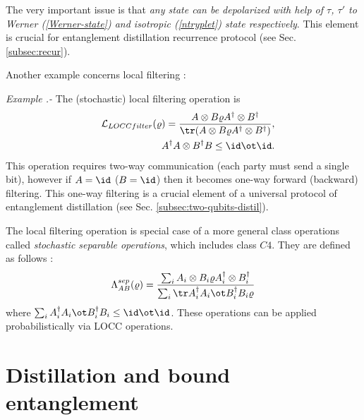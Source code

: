\documentclass[rmp,12pt,preprint]{revtex4-2}
\begin{document}
The very important issue is that {\it any state can be depolarized
  with help of $\tau$, $\tau'$ to Werner (\ref{Werner-state}) and
  isotropic (\ref{ntryplet}) state respectively}. This element is
crucial for entanglement distillation recurrence protocol
\cite{BBPSSW1996} (see Sec. \ref{subsec:recur}).

Another example concerns local filtering \cite{BBPS1996,Gisin96}:

{\it Example .-} The (stochastic) local filtering operation is
\begin{eqnarray}
&&{\cal L}_{LOCCfilter}(\varrho)=\frac{A \otimes B \varrho A^\dagger
\otimes B^\dagger }{{\tr}(A \otimes B \varrho A^\dagger \otimes
B^\dagger)}, \nonumber \\
&&A^{\dagger}A \otimes B^{\dagger}B \leq \id\ot\id.
\end{eqnarray}
This operation requires two-way communication (each party must send a
single bit), however if $A=\id$ ($B=\id$) then it becomes one-way
forward (backward) filtering. This one-way filtering is a crucial
element of a universal protocol of entanglement distillation
\cite{HHH1997-distill} (see Sec. \ref{subsec:two-qubits-distil}).

The local filtering operation is special case of a more general class
operations called {\it stochastic separable operations}, which
includes class $C4$. They are defined as follows
\cite{PlenioVedral1998,RainsSep}:
\begin{eqnarray}
\Lambda^{sep}_{AB}(\varrho)={\sum_{i} A_{i} \otimes B_{i} \varrho
A_{i}^{\dagger} \otimes B_{i}^{\dagger} \over \sum_i {\tr} A_i^{\dagger}A_i\ot B_i^{\dagger}B_i\varrho}
\end{eqnarray}
where $\sum_i A_i^{\dagger}A_i\ot B_i^{\dagger}B_i\leq \id\ot\id$.
These operations can be applied probabilistically via LOCC operations.



\section{Distillation and bound entanglement}
\label{sec:distil}
\end{document}
